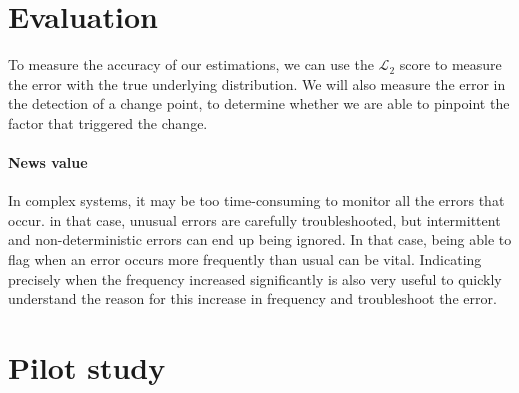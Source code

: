 \documentclass{kththesis}
\begin{document}

\section{Evaluation}

To measure the accuracy of our estimations, we can use the $\mathcal{L}_2$ score to measure the error with the true underlying distribution. We will also measure the error in the detection of a change point, to determine whether we are able to pinpoint the factor that triggered the change.

\paragraph*{News value}


In complex systems, it may be too time-consuming to monitor all the errors that occur. in that case, unusual errors are carefully troubleshooted, but intermittent and non-deterministic errors can end up being ignored. In that case, being able to flag when an error occurs more frequently than usual can be vital. Indicating precisely when the frequency increased significantly is also very useful to quickly understand the reason for this increase in frequency and troubleshoot the error.



\section{Pilot study}
\end{document}
